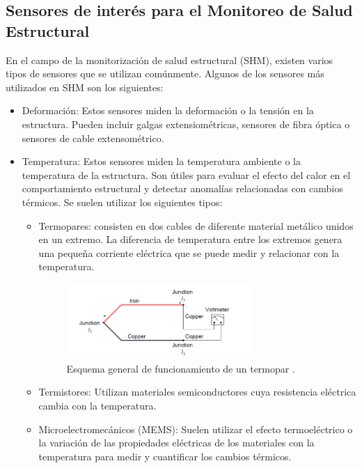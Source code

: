 \subsection{Sensores de interés para el Monitoreo de Salud Estructural}

En el campo de la monitorización de salud estructural (SHM), existen varios tipos de sensores que se utilizan comúnmente. Algunos de los sensores más utilizados en SHM son los siguientes:

    \begin{itemize}
        \item Deformación: Estos sensores miden la deformación o la tensión en la estructura. Pueden incluir galgas extensiométricas, sensores de fibra óptica o sensores de cable extensométrico.
        \item Temperatura:  Estos sensores miden la temperatura ambiente o la temperatura de la estructura. Son útiles para evaluar el efecto del calor en el comportamiento estructural y detectar anomalías relacionadas con cambios térmicos. Se suelen utilizar los siguientes tipos:
        \begin{itemize}
            \item Termopares: consisten en dos cables de diferente material metálico unidos en un extremo. La diferencia de temperatura entre los extremos genera una pequeña corriente eléctrica que se puede medir y relacionar con la temperatura.
             \begin{figure}[H]
                \centering
                \includegraphics[width = 0.7\textwidth]{imagenes/cap1_marcoteo/termocupla-con-voltimetro.png}
                \caption{Esquema general de funcionamiento de un termopar \citep{dunn2005introduction}.}
                \label{fig:termopar}
            \end{figure}
            \item Termistores: Utilizan materiales semiconductores cuya resistencia eléctrica cambia con la temperatura. 
            \item Microelectromecánicos (MEMS): Suelen utilizar el efecto termoeléctrico o la variación de las propiedades eléctricas de los materiales con la temperatura para medir y cuantificar los cambios térmicos.

\end{itemize}
\end{itemize}
